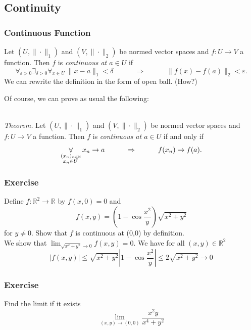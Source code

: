 \documentclass[12pt, t]{beamer}
\renewcommand{\emph}[1]{{\color{Turquoise3}\textsl{#1}}}
\newcommand{\N}{\mathbb{N}}
\newcommand{\nullspace}{~\\[15pt]}
\begin{document}
\subsection{Continuity}
\begin{frame}
    \frametitle{Continuous Function}
    Let $(U,\|\cdot\|_1)$ and $(V,\|\cdot\|_2)$ be normed vector spaces and $f:U\to V$ a function. Then $f$ is \emph{continuous at $a\in U$} if
    \begin{equation}\label{2.1.9}
        \mathop{\forall}_{\varepsilon>0}\mathop{\exists}_{\delta>0}\mathop{\forall}_{x\in U}~\|x-a\|_1<\delta\qquad\quad\Rightarrow\qquad\quad\|f(x)-f(a)\|_2<\varepsilon.
    \end{equation}
    \vspace*{9pt}
    We can rewrite the definition in the form of open ball. (How?)

    Of course, we can prove as usual the following:

    \nullspace
    \emph{Theorem.} Let $(U,\|\cdot\|_1)$ and $(V,\|\cdot\|_2)$ be normed vector spaces and $f:U\to V$ a function. Then $f$ is \emph{continuous at $a\in U$} if and only if
    \begin{equation}\label{2.1.10}
        \mathop{\forall}_{\begin{subarray}
                ~(x_n)_{n\in\N}\\
                ~x_n\in U
            \end{subarray}}x_n\to a\qquad\quad\Rightarrow\qquad\quad f(x_n)\to f(a).
    \end{equation}
\end{frame}

\begin{frame}
    \frametitle{Exercise}
    Define $f: \mathbb{R}^{2} \rightarrow \mathbb{R}$ by $f(x, 0)=0$ and
    \[
        f(x, y)=\left(1-\cos \frac{x^{2}}{y}\right) \sqrt{x^{2}+y^{2}}
    \]
    for $y \neq 0$. Show that $f$ is continuous at (0,0) by definition.
    \nullspace
    \pause
    We show that $\lim _{\sqrt{x^{2}+y^{2}} \rightarrow 0} f(x, y)=0 .$ We have for all $(x, y) \in \mathbb{R}^{2}$
    \[
        |f(x, y)| \leq \sqrt{x^{2}+y^{2}}\left|1-\cos \frac{x^{2}}{y}\right| \leq 2 \sqrt{x^{2}+y^{2}} \rightarrow 0
    \]

\end{frame}

\begin{frame}
    \frametitle{Exercise}
    Find the limit if it exists
    \[
        \lim _{(x, y) \rightarrow(0,0)} \frac{x^{2} y}{x^{4}+y^{2}}
    \]

\end{frame}
\end{document}
